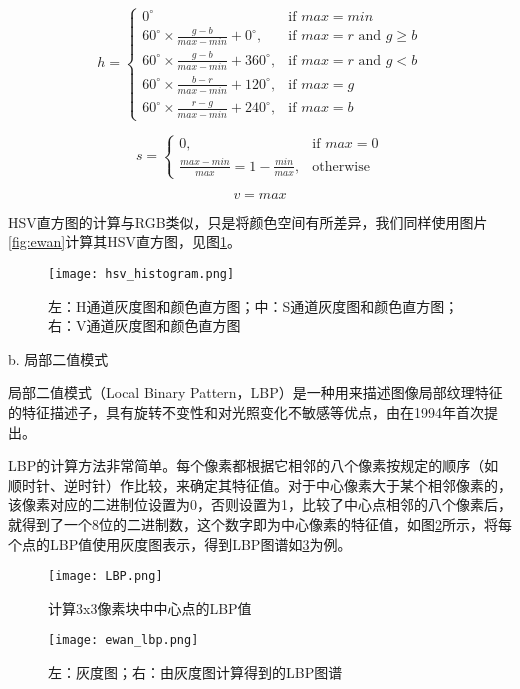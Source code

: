 $$h={\begin{cases}0^{\circ }&{\mbox{if }}max=min\\60^{\circ }\times {\frac  {g-b}{max-min}}+0^{\circ },&{\mbox{if }}max=r{\mbox{ and }}g\geq b\\60^{\circ }\times {\frac  {g-b}{max-min}}+360^{\circ },&{\mbox{if }}max=r{\mbox{ and }}g<b\\60^{\circ }\times {\frac  {b-r}{max-min}}+120^{\circ },&{\mbox{if }}max=g\\60^{\circ }\times {\frac  {r-g}{max-min}}+240^{\circ },&{\mbox{if }}max=b\end{cases}}$$

$$s={\begin{cases}0,&{\mbox{if }}max=0\\{\frac  {max-min}{max}}=1-{\frac  {min}{max}},&{\mbox{otherwise}}\end{cases}}$$

$$
v=max
$$

  HSV直方图的计算与RGB类似，只是将颜色空间有所差异，我们同样使用图片\ref{fig:ewan}计算其HSV直方图，见图\ref{fig:hsvhistogram}。

\begin{figure}[htb]
  \centering
  \texttt{[image: hsv\_histogram.png]}
  \caption{左：H通道灰度图和颜色直方图；中：S通道灰度图和颜色直方图；右：V通道灰度图和颜色直方图}
  \label{fig:hsvhistogram}
\end{figure}

  b. 局部二值模式

  局部二值模式（Local Binary Pattern，LBP）是一种用来描述图像局部纹理特征的特征描述子，具有旋转不变性和对光照变化不敏感等优点，由\citet{ojala1994performance}在1994年首次提出。

  LBP的计算方法非常简单。每个像素都根据它相邻的八个像素按规定的顺序（如顺时针、逆时针）作比较，来确定其特征值。对于中心像素大于某个相邻像素的，该像素对应的二进制位设置为0，否则设置为1，比较了中心点相邻的八个像素后，就得到了一个8位的二进制数，这个数字即为中心像素的特征值，如图\ref{fig:lbp_procedure}所示，将每个点的LBP值使用灰度图表示，得到LBP图谱如\ref{fig:lbp}为例。

\begin{figure}[htb]
  \centering
  \texttt{[image: LBP.png]}
  \caption{计算3x3像素块中中心点的LBP值}
  \label{fig:lbp_procedure}
\end{figure}

\begin{figure}[htb]
  \centering
  \texttt{[image: ewan\_lbp.png]}
  \caption{左：灰度图；右：由灰度图计算得到的LBP图谱}
  \label{fig:lbp}
\end{figure}

